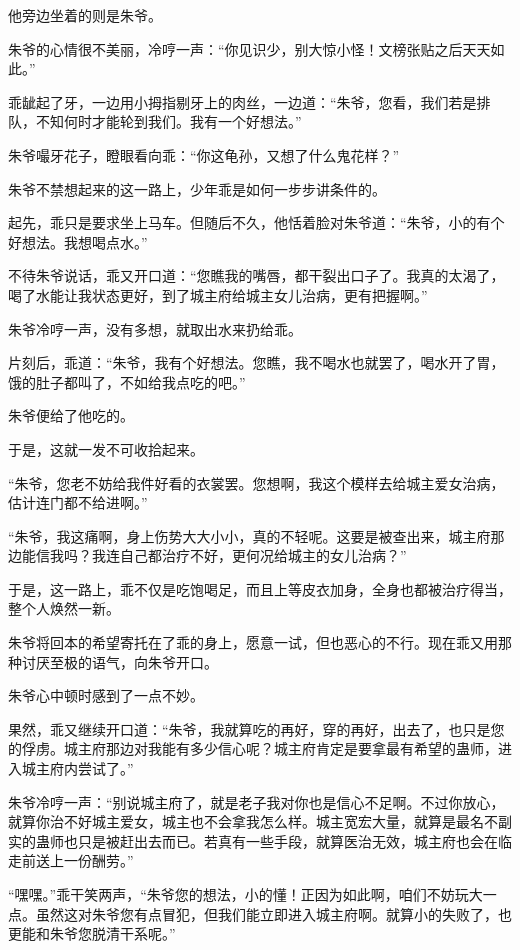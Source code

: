 \begin{this_body}
他旁边坐着的则是朱爷。

朱爷的心情很不美丽，冷哼一声：“你见识少，别大惊小怪！文榜张贴之后天天如此。”

乖龇起了牙，一边用小拇指剔牙上的肉丝，一边道：“朱爷，您看，我们若是排队，不知何时才能轮到我们。我有一个好想法。”

朱爷嘬牙花子，瞪眼看向乖：“你这龟孙，又想了什么鬼花样？”

朱爷不禁想起来的这一路上，少年乖是如何一步步讲条件的。

起先，乖只是要求坐上马车。但随后不久，他恬着脸对朱爷道：“朱爷，小的有个好想法。我想喝点水。”

不待朱爷说话，乖又开口道：“您瞧我的嘴唇，都干裂出口子了。我真的太渴了，喝了水能让我状态更好，到了城主府给城主女儿治病，更有把握啊。”

朱爷冷哼一声，没有多想，就取出水来扔给乖。

片刻后，乖道：“朱爷，我有个好想法。您瞧，我不喝水也就罢了，喝水开了胃，饿的肚子都叫了，不如给我点吃的吧。”

朱爷便给了他吃的。

于是，这就一发不可收拾起来。

“朱爷，您老不妨给我件好看的衣裳罢。您想啊，我这个模样去给城主爱女治病，估计连门都不给进啊。”

“朱爷，我这痛啊，身上伤势大大小小，真的不轻呢。这要是被查出来，城主府那边能信我吗？我连自己都治疗不好，更何况给城主的女儿治病？”

于是，这一路上，乖不仅是吃饱喝足，而且上等皮衣加身，全身也都被治疗得当，整个人焕然一新。

朱爷将回本的希望寄托在了乖的身上，愿意一试，但也恶心的不行。现在乖又用那种讨厌至极的语气，向朱爷开口。

朱爷心中顿时感到了一点不妙。

果然，乖又继续开口道：“朱爷，我就算吃的再好，穿的再好，出去了，也只是您的俘虏。城主府那边对我能有多少信心呢？城主府肯定是要拿最有希望的蛊师，进入城主府内尝试了。”

朱爷冷哼一声：“别说城主府了，就是老子我对你也是信心不足啊。不过你放心，就算你治不好城主爱女，城主也不会拿我怎么样。城主宽宏大量，就算是最名不副实的蛊师也只是被赶出去而已。若真有一些手段，就算医治无效，城主府也会在临走前送上一份酬劳。”

“嘿嘿。”乖干笑两声，“朱爷您的想法，小的懂！正因为如此啊，咱们不妨玩大一点。虽然这对朱爷您有点冒犯，但我们能立即进入城主府啊。就算小的失败了，也更能和朱爷您脱清干系呢。”


\end{this_body}
